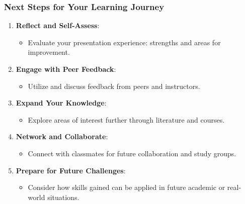 \documentclass[aspectratio=169]{beamer}
\begin{document}
\begin{frame}[fragile]
    \frametitle{Next Steps for Your Learning Journey}
    \begin{enumerate}
        \item \textbf{Reflect and Self-Assess}:
        \begin{itemize}
            \item Evaluate your presentation experience: strengths and areas for improvement.
        \end{itemize}
        
        \item \textbf{Engage with Peer Feedback}:
        \begin{itemize}
            \item Utilize and discuss feedback from peers and instructors.
        \end{itemize}
        
        \item \textbf{Expand Your Knowledge}:
        \begin{itemize}
            \item Explore areas of interest further through literature and courses.
        \end{itemize}
        
        \item \textbf{Network and Collaborate}:
        \begin{itemize}
            \item Connect with classmates for future collaboration and study groups.
        \end{itemize}
        
        \item \textbf{Prepare for Future Challenges}:
        \begin{itemize}
            \item Consider how skills gained can be applied in future academic or real-world situations.
        \end{itemize}
    \end{enumerate}
\end{frame}
\end{document}
